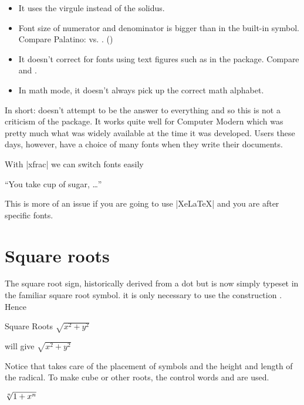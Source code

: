  \begin{itemize}
  \item It uses the virgule instead of the solidus.
  \item Font size of numerator and denominator is bigger than in the
    built-in symbol. Compare Palatino: 
    vs. . ()

  \item It doesn't correct for fonts using text figures such as in the
     package. Compare  and
    .
  \item In math mode, it doesn't always pick up the correct math
    alphabet.
 \end{itemize}

In short:  doesn't attempt to be the answer to
everything and so this is not a criticism of the package. It works
quite well for Computer Modern which was pretty much what was widely
available at the time it was developed. Users these days, however,
have a choice of many fonts when they write their documents.

With |xfrac| we can switch fonts easily

 ``You take  cup of sugar, \ldots''

This is more of an issue if you are going to use |XeLaTeX| and 
you are after specific fonts.


\section{Square roots}

The square root sign, historically derived from a dot but is now simply typeset in the familiar square root symbol.  it is only necessary to use the construction . Hence

\begin{texexample}{Square Roots}{}
$\sqrt{x^2+y^2}$
\end{texexample}

will give $\sqrt{x^2+y^2}$


Notice that \tex takes care of the placement of
symbols and the height and length of the radical. To make cube or other roots, the control
words  and  are used.  

\begin{texexample}{}{}
   $\root n \of  {1+x^n}$ 
\end{texexample}

